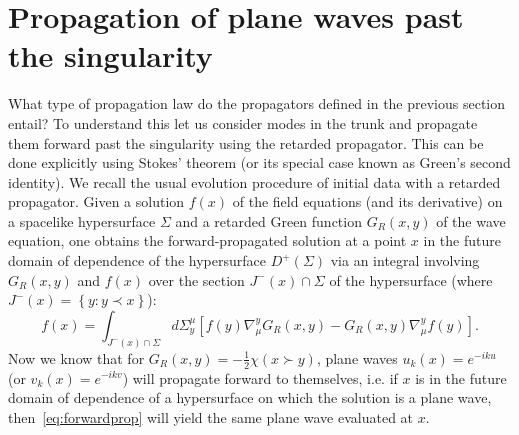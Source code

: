 \documentclass[12pt]{article}
\newcommand{\be}{\begin{equation}}
\newcommand{\ee}{\end{equation}}
\begin{document}
\section{Propagation of plane waves past the singularity}\label{sec:proppastsing}
What type of propagation law do the propagators defined in the previous section entail? To understand this let us consider modes in the trunk and propagate them forward past the singularity using the retarded propagator. This can be done explicitly using Stokes' theorem (or its special case known as Green's second identity). We recall the usual evolution procedure of initial data with a retarded propagator. Given a solution $f(x)$ of the field equations (and its derivative) on a spacelike hypersurface $\Sigma$ and a retarded Green function $G_R(x,y)$ of the wave equation, one obtains the forward-propagated solution at a point $x$ in the future domain of dependence of the hypersurface $D^+(\Sigma)$ via an integral involving $G_R(x,y)$ and $f(x)$ over the section $J^-(x)\cap\Sigma$ of the hypersurface (where $J^-(x)=\left\{y:y\prec x\right\}$):
\be
f(x) = \int_{J^-(x)\cap\Sigma} d\Sigma_y^\mu\left[f(y)\nabla^y_\mu G_R(x,y)-G_R(x,y)\nabla^y_\mu f(y)\right].\label{eq:forwardprop}
\ee
Now we know that for $G_R(x,y)=-\frac12\chi(x\succ y)$, plane waves $u_k(x)=e^{-iku}$ (or $v_k(x)=e^{-ikv}$) will propagate forward to themselves, i.e. if $x$ is in the future domain of dependence of a hypersurface on which the solution is a plane wave, then~\eqref{eq:forwardprop} will yield the same plane wave evaluated at $x$.
\end{document}
